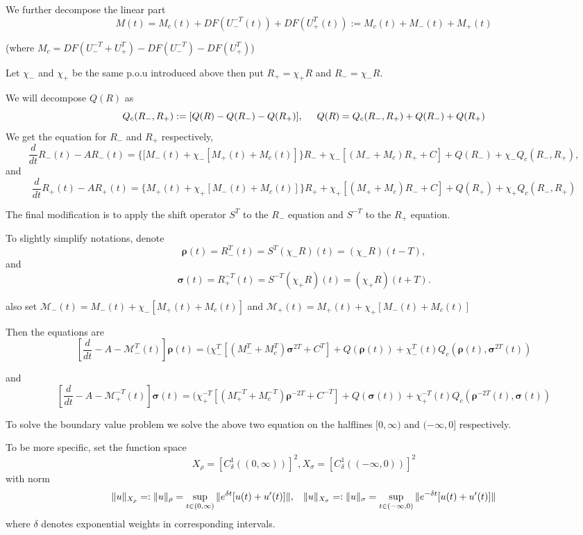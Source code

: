 \documentclass[letterpaper,11pt]{article}
\newcommand{\Rho}{\bm{\rho}}
\newcommand{\bigma}{\bm{\sigma}}
\numberwithin{equation}{section}
\theoremstyle{plain}
\begin{document}
We further decompose the linear part
\[
M(t)  = M_c(t) + DF(U_-^{-T}(t))+DF(U_+^T(t)):=M_c(t)+M_-(t)+M_+(t)
\]

(where $M_c = DF(U_-^{-T}+U_+^T)-DF(U_-^{-T})-DF(U_+^T)$)


Let $\chi_-$ and $\chi_+$ be the same p.o.u introduced above
then put $R_+ = \chi_+R$ and $R_-=\chi_-R$.

We will decompose $Q(R)$ as
\[
Q_c(R_-,R_+) := [Q(R)-Q(R_-)-Q(R_+)], \hspace{0.5cm} Q(R) = Q_c(R_-,R_+)+ Q(R_-)+Q(R_+)
\]
We get the equation for $R_-$ and $R_+$ respectively,
\[
\frac{d}{dt}R_-(t) - AR_-(t) =\{[M_-(t)  +\chi_-[M_+(t)+M_c(t)] \}R_- +\chi_-[(M_-+M_c)R_+ +C]+Q(R_-)+\chi_-Q_c(R_-,R_+), 
\]
and
\[
\frac{d}{dt}R_+(t) - AR_+(t) = \{M_+(t) +\chi_+[M_-(t)+M_c(t)] \}R_++\chi_+[(M_++M_c)R_- + C]+Q(R_+)+\chi_+Q_c(R_-,R_+)
\]

The final modification is to apply the shift operator $S^T$ to the $R_-$ equation and $S^{-T}$ to the $R_+$ equation.

To slightly simplify notations, denote 
\[
\Rho(t) = R_-^T(t) = S^T(\chi_-R)(t) = (\chi_-R)(t-T),
\]
 and 
 \[
 \bigma(t) = R_+^{-T}(t) = S^{-T}(\chi_+R)(t) = (\chi_+R)(t+T). 
 \]
 
also set $\mathcal{M}_-(t) = M_-(t)  +\chi_-[M_+(t)+M_c(t)]$ and 
$\mathcal{M}_+(t) =  M_+(t) +\chi_+[M_-(t)+M_c(t)]$

Then the equations are
\begin{equation}\label{plus}
\left[\frac{d}{dt}-A-\mathcal{M}_-^T(t) \right]\bm{\rho}(t)  = (\chi_-^T[(M_-^T+M_c^T)\bigma^{2T}+C^T] + Q(\bm{\rho}(t))+\chi_-^T(t)Q_c(\bm{\rho}(t),\bm{\sigma}^{2T}(t))
\end{equation}

and 
\begin{equation}\label{minus}
\left[\frac{d}{dt}-A-\mathcal{M}_+^{-T}(t)\right]\bm{\sigma}(t)  = (\chi_+^{-T}[(M_+^{-T}+M_c^{-T})\Rho^{-2T}+C^{-T}]+ Q(\bm{\sigma}(t))+\chi_+^{-T}(t)Q_c(\bm{\rho}^{-2T}(t),\bm{\sigma}(t))
\end{equation}


To solve the boundary value problem we solve the above two equation on the halflines $[0,\infty)$ and $(-\infty,0]$ respectively.

To be more specific, set the function space
\[
X_\rho = [C^1_{\delta}((0,\infty))]^2, X_\sigma = [C^1_{\delta}((-\infty,0))]^2
\]
with norm
\[
\|u\|_{X_\rho} =: \|u\|_{\rho} = \sup_{t \in (0,\infty)} \|e^{\delta t}[u(t)+u'(t)]\|, \hspace{0.3cm}\|u\|_{X_\sigma} =: \|u\|_{\sigma} = \sup_{t \in (-\infty,0)} \|e^{-\delta t}[u(t)+u'(t)]\|
\]
where $\delta$ denotes exponential weights in corresponding intervals.
\end{document}
